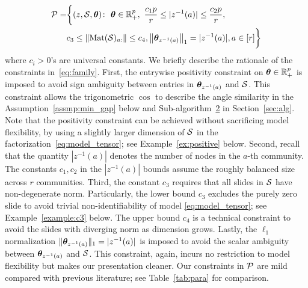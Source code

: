 \documentclass[journal]{IEEEtran}
\theoremstyle{definition}
\theoremstyle{definition}
\begin{document}
\vspace{-0.5cm}
\small
\begin{align}
\tP=  &\bigg\{  (z,\tS,\mtheta)\colon  \ \mtheta\in\mathbb{R}^p_{+},\ 
{c_1p\over r}\leq |z^{-1}(a)|\leq {c_2 p\over r}, \\
& c_3\leq \onormSize{}{\text{Mat}(\tS)_{a:}}\leq c_4, \onorm{\mtheta_{z^{-1}(a)}}_1=|z^{-1}(a)|, a\in[r]\bigg\}\label{eq:family}
\end{align}
\normalsize
where $c_i>0$'s are universal constants. We briefly describe the rationale of the constraints in~\eqref{eq:family}. 
First, the entrywise positivity constraint on  $\boldsymbol{\theta}\in\mathbb{R}^p_{+}$ is imposed to avoid sign ambiguity between entries in $\boldsymbol{\theta}_{z^{-1}(a)}$ and $\mathcal{S}$. This constraint allows the trigonometric $\cos$ to describe the angle similarity in the Assumption~\ref{assmp:min_gap} below and Sub-algorithm~\hyperref[alg:main]{2} in Section~\ref{sec:alg}. Note that the positivity constraint can be achieved without sacrificing model flexibility, by using a slightly larger dimension of $\mathcal{S}$ in the factorization~\eqref{eq:model_tensor}; see Example~\ref{ex:positive} below. Second, recall that the quantity $|z^{-1}(a)|$ denotes the number of nodes in the $a$-th community. The constants $c_1, c_2$ in the $|z^{-1}(a)|$ bounds assume the roughly balanced size across $r$ communities.  
{Third, the constant $c_3$ requires that all slides in $\mathcal{S}$ have non-degenerate norm. Particularly, the lower bound $c_3$ excludes the purely zero slide to avoid trivial non-identifiability of model \eqref{eq:model_tensor}; see Example~\ref{example:c3} below. The upper bound $c_4$ is a technical constraint to avoid the slides with diverging norm as dimension grows.} 
Lastly, the $\ell_1$ normalization $\lVert\boldsymbol{\theta}_{z^{-1}(a)}\rVert_1=|z^{-1}(a)|$ is imposed to avoid the scalar ambiguity between $\boldsymbol{\theta}_{z^{-1}(a)}$ and $\mathcal{S}$. This constraint, again, incurs no restriction to model flexibility but makes our presentation cleaner.   {Our constraints in $\mathcal{P}$ are mild compared with previous literature; see Table~\ref{tab:para} for comparison.} 
\end{document}
